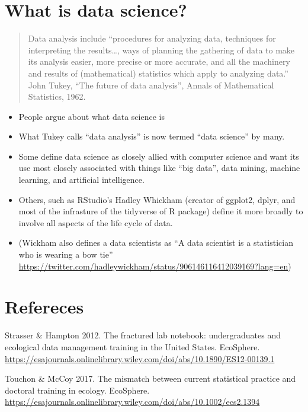 \documentclass[
]{book}
\providecommand{\tightlist}{%
  \setlength{\itemsep}{0pt}\setlength{\parskip}{0pt}}
\begin{document}
\hypertarget{what-is-data-science}{%
\section{What is data science?}\label{what-is-data-science}}

\begin{quote}
Data analysis include ``procedures for analyzing data, techniques for interpreting the results\ldots, ways of planning the gathering of data to make its analysis easier, more precise or more accurate, and all the machinery and results of (mathematical) statistics which apply to analyzing data.'' John Tukey, ``The future of data analysis'', Annals of Mathematical Statistics, 1962.
\end{quote}

\begin{itemize}
\tightlist
\item
  People argue about what data science is
\item
  What Tukey calls ``data analysis'' is now termed ``data science'' by many.\\
\item
  Some define data science as closely allied with computer science and want its use most closely associated with things like ``big data'', data mining, machine learning, and artificial intelligence.
\item
  Others, such as RStudio's Hadley Whickham (creator of ggplot2, dplyr, and most of the infrasture of the tidyverse of R package) define it more broadly to involve all aspects of the life cycle of data.
\item
  (Wickham also defines a data scientists as ``A data scientist is a statistician who is wearing a bow tie'' \url{https://twitter.com/hadleywickham/status/906146116412039169?lang=en})
\end{itemize}

\hypertarget{refereces}{%
\section{Refereces}\label{refereces}}

Strasser \& Hampton 2012. The fractured lab notebook: undergraduates and ecological data management training in the United States. EcoSphere. \url{https://esajournals.onlinelibrary.wiley.com/doi/abs/10.1890/ES12-00139.1}

Touchon \& McCoy 2017. The mismatch between current statistical practice and doctoral training in ecology. EcoSphere. \url{https://esajournals.onlinelibrary.wiley.com/doi/abs/10.1002/ecs2.1394}
\end{document}
